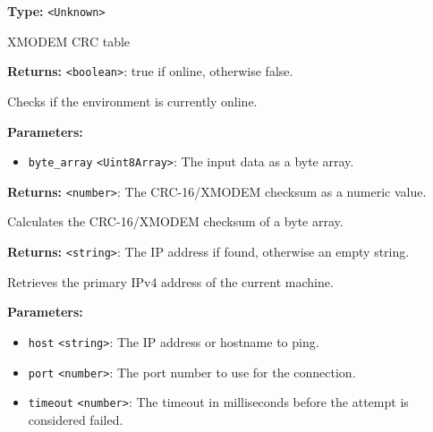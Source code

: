 \documentclass[12pt,a4paper]{article}
\begin{document}
\noindent \textbf{Type:} \texttt{<Unknown>}

\noindent XMODEM CRC table

\vspace{5mm}
\noindent {}


\noindent \textbf{Returns:} \texttt{<boolean>}: \textasciigrave{}true\textasciigrave{} if online, otherwise \textasciigrave{}false\textasciigrave{}.

\noindent Checks if the environment is currently online.

\vspace{5mm}
\noindent {}


\noindent \textbf{Parameters:}
\begin{itemize}
  \item \texttt{byte\_array} \texttt{<Uint8Array>}: The input data as a byte array.
\end{itemize}

\noindent \textbf{Returns:} \texttt{<number>}: The CRC-16/XMODEM checksum as a numeric value.

\noindent Calculates the CRC-16/XMODEM checksum of a byte array.

\vspace{5mm}
\noindent {}


\noindent \textbf{Returns:} \texttt{<string>}: The IP address if found, otherwise an empty string.

\noindent Retrieves the primary IPv4 address of the current machine.

\vspace{5mm}
\noindent {}


\noindent \textbf{Parameters:}
\begin{itemize}
  \item \texttt{host} \texttt{<string>}: The IP address or hostname to ping.
  \item \texttt{port} \texttt{<number>}: The port number to use for the connection.
  \item \texttt{timeout} \texttt{<number>}: The timeout in milliseconds before the attempt is considered failed.
\end{itemize}
\end{document}
